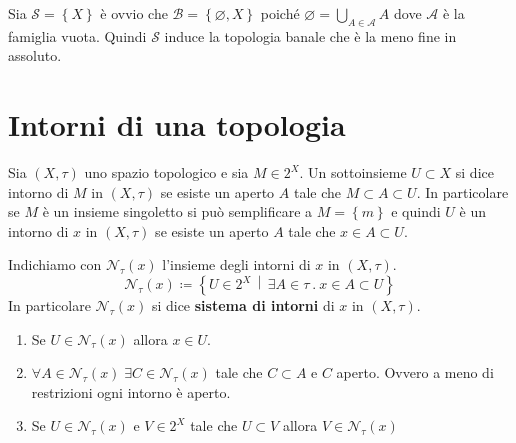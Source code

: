 \begin{remark}
	Sia $\mathcal{S} = \left\{X\right\}$ è ovvio che $\mathcal{B} = \left\{\varnothing, X\right\}$ poiché $\varnothing = \bigcup_{A \in \mathcal{A}} A $ dove $\mathcal{A}$ è la famiglia vuota. Quindi $\mathcal{S}$ induce la topologia banale che è la meno fine in assoluto.
\end{remark}

\section{Intorni di una topologia}

\begin{definition}
	Sia $(X,\tau)$ uno spazio topologico e sia $M \in 2^X$. Un sottoinsieme $U \subset X$ si dice intorno di $M$ in $(X,\tau)$ se esiste un aperto $A$ tale che $M \subset A \subset U$. In particolare se $M$ è un insieme singoletto si può semplificare a $M = \left\{m\right\}$ e quindi $U$ è un intorno di $x$ in $(X,\tau)$ se esiste un aperto $A$ tale che $x \in A \subset U$.
\end{definition}

\begin{definition}
	Indichiamo con $\mathcal{N}_\tau(x)$ l'insieme degli intorni di $x$ in $(X,\tau)$. 
	\begin{equation*}
		\mathcal{N}_\tau(x) \coloneqq \left\{ U \in 2^X \,\middle|\, \exists A \in \tau\ .\ x \in A \subset U \right\}
	\end{equation*}
	In particolare $\mathcal{N}_\tau(x)$ si dice \textbf{sistema di intorni} di $x$ in $(X, \tau)$.
\end{definition}

\begin{remark}
	\label{rmk:intorni_top}
	\begin{enumerate}
		\item Se $U \in \mathcal{N}_\tau(x)$ allora $x \in U$.
		\item $\forall A \in \mathcal{N}_\tau(x) \; \exists C \in \mathcal{N}_\tau(x)$ tale che $C \subset A$ e $C$ aperto. Ovvero a meno di restrizioni ogni intorno è aperto.
		\item Se $U \in \mathcal{N}_\tau(x)$ e $V \in 2^X$ tale che $U \subset V$ allora $V \in \mathcal{N}_\tau(x)$ 
	\end{enumerate}	
\end{remark}

